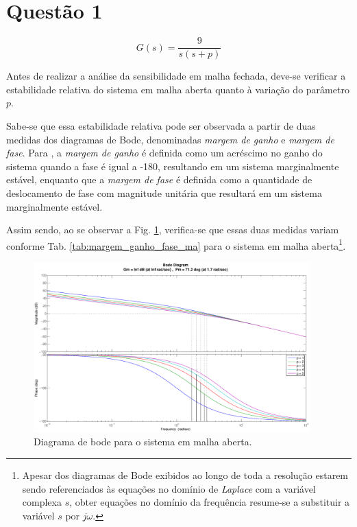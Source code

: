 \chapter*{Questão 1}

\begin{equation}\nonumber
G(s) = \frac{9}{s(s+p)}
\end{equation}


\vspace{0.5cm}


\vspace{0.25cm}

Antes de realizar a análise da sensibilidade em malha fechada, deve-se verificar
a estabilidade relativa do sistema em malha aberta quanto à variação do
parâmetro $p$. 

Sabe-se que essa estabilidade relativa pode ser observada a partir de duas
medidas dos diagramas de Bode, denominadas {\it margem de ganho} e {\it margem
de fase}. Para , a {\it margem de ganho} é definida como
um acréscimo no ganho do sistema quando a fase é igual a -180\textdegree,
resultando em um sistema marginalmente estável, enquanto que a {\it margem de
fase} é definida como a quantidade de deslocamento de fase com magnitude
unitária que resultará em um sistema marginalmente estável.

Assim sendo, ao se observar a Fig. \ref{fig:bode_ma}, verifica-se que essas duas
medidas variam conforme Tab. \ref{tab:margem_ganho_fase_ma} para o sistema em
malha aberta\footnote{Apesar dos diagramas de Bode exibidos ao longo de toda a
resolução estarem sendo referenciados às equações no domínio de {\it Laplace}
com a variável complexa $s$, obter equações no domínio da frequência resume-se a
substituir a variável $s$ por $j\omega$.}.

\begin{figure}[htb]
\centering
    \includegraphics[width=0.95\textwidth]{imgs/questao1/bode_ma}
    \caption{Diagrama de bode para o sistema em malha aberta.}
    \label{fig:bode_ma}
\end{figure}

